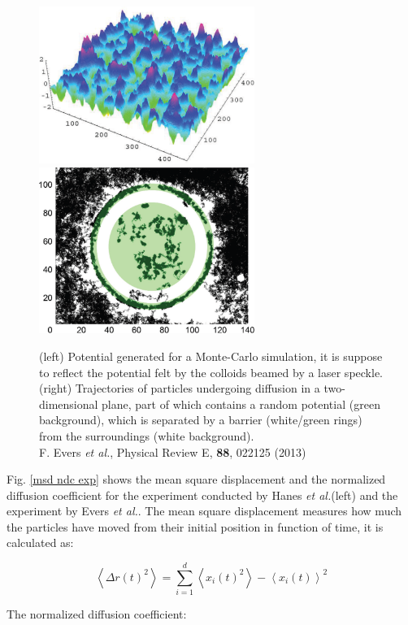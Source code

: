 \documentclass[a4paper,12pt]{article}
\newcommand{\etal}{\textit{et al.}}
\begin{document}
\begin{figure}[htbp]
\centering
\subfigure
{\includegraphics[width=7cm]{pics/optic_pot.png}}
\subfigure
{\includegraphics[width=7cm]{pics/colloids.png}}
\caption{(left) Potential generated for a Monte-Carlo simulation, it is suppose to reflect the potential felt by the colloids beamed by a laser speckle.\\(right) Trajectories of particles undergoing diffusion in a two-dimensional plane, part of which contains a random potential (green background), which is separated by a barrier (white/green rings) from the surroundings (white background).\\ \small F. Evers \etal, Physical Review E, \textbf{88}, 022125 (2013)}
\label{potential and colloids}
\end{figure}

Fig. \ref{msd ndc  exp} shows the mean square displacement and the normalized diffusion coefficient for the experiment conducted by Hanes \etal (left) and the experiment by Evers \etal. The mean square displacement measures how much the particles have moved from their initial position in function of time, it is calculated as:

\begin{equation}
\left< \Delta r(t)^2\right> = \sum_{i=1}^d \left< x_i(t)^2 \right>  - \left< x_i(t) \right>^2
\end{equation}

The normalized diffusion coefficient:
\end{document}

